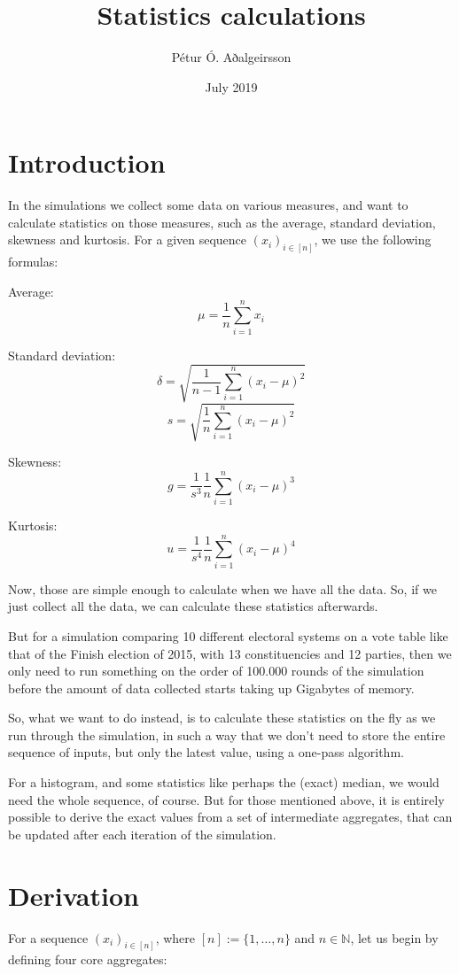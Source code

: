 \documentclass{article}
\title{Statistics calculations}
\author{Pétur Ó. Aðalgeirsson}
\date{July 2019}
\newcommand{\N}{\mathbb{N}}
\begin{document}
\maketitle

\section{Introduction}

In the simulations we collect some data on various measures,
and want to calculate statistics on those measures,
such as the average, standard deviation, skewness and kurtosis.
For a given sequence $(x_i)_{i\in [n]}$, we use the following formulas:

Average:
\[\mu = \frac{1}{n}\sum_{i=1}^n x_i\]

Standard deviation:
\[\delta = \sqrt{\frac{1}{n-1}\sum_{i=1}^n(x_i-\mu)^2}\]
\[s = \sqrt{\frac{1}{n}\sum_{i=1}^n(x_i-\mu)^2}\]

Skewness:
\[g = \frac{1}{s^3}\frac{1}{n}\sum_{i=1}^n(x_i-\mu)^3\]

Kurtosis:
\[u = \frac{1}{s^4}\frac{1}{n}\sum_{i=1}^n(x_i-\mu)^4\]

Now, those are simple enough to calculate when we have all the data.
So, if we just collect all the data, we can calculate these statistics afterwards.

But for a simulation comparing 10 different electoral systems
on a vote table like that of the Finish election of 2015,
with 13 constituencies and 12 parties,
then we only need to run something on the order of 100.000 rounds of the simulation
before the amount of data collected starts taking up Gigabytes of memory.

So, what we want to do instead,
is to calculate these statistics on the fly as we run through the simulation,
in such a way that we don't need to store the entire sequence of inputs,
but only the latest value,
using a one-pass algorithm.

For a histogram, and some statistics like perhaps the (exact) median,
we would need the whole sequence, of course.
But for those mentioned above,
it is entirely possible to derive the exact values
from a set of intermediate aggregates,
that can be updated after each iteration of the simulation.

\pagebreak
\section{Derivation}

For a sequence $(x_i)_{i\in [n]}$,
where $[n] := \{1, \dots, n\}$ and $n\in\N$,
let us begin by defining four core aggregates:
\end{document}
